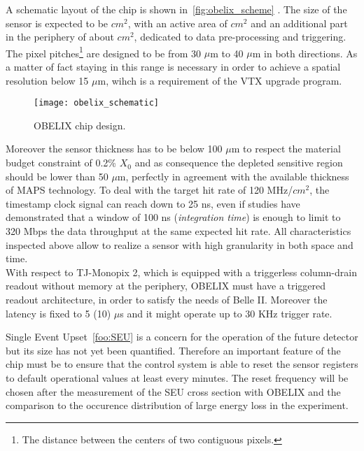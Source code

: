 A schematic layout of the chip is shown in~\autoref{fig:obelix_scheme} . The size of the sensor is expected to be  $cm^{2}$, with an active area of  $cm^{2}$ and an additional part in the periphery of about  $cm^{2}$, dedicated to data pre-processing and triggering. The pixel pitches\footnote{The distance between the centers of two contiguous pixels.} are designed to be from 30 $\mu$m to 40 $\mu$m in both directions. As a matter of fact staying in this range is necessary in order to achieve a spatial resolution below 15 $\mu$m, wihch is a requirement of the VTX upgrade program.

\begin{figure}[h!]
\centering
\texttt{[image: obelix\_schematic]}
\caption{OBELIX chip design.}
\label{fig:obelix_scheme}
\end{figure}

Moreover the sensor thickness has to be below 100 $\mu$m to respect the material budget constraint of 0.2\% $X_{0}$ and as consequence the depleted sensitive region should be lower than 50 $\mu$m, perfectly in agreement with the available thickness of MAPS  technology. 
To deal with the target hit rate of 120 MHz/$cm^{2}$, the timestamp clock signal can reach down to 25 ns, even if studies have demonstrated that a window of 100 ns (\textit{integration time}) is enough to limit to 320 Mbps the data throughput at the same expected hit rate. 
All characteristics inspected above allow to realize a sensor with high granularity in both space and time.\\

With respect to TJ-Monopix 2, which is equipped with a triggerless column-drain readout without memory at the periphery, OBELIX must have a triggered readout architecture, in order to satisfy the needs of Belle II. Moreover the latency is fixed to 5 (10) $\mu$s and it might operate up to 30 KHz trigger rate.

Single Event Upset~\autoref{foo:SEU} is a concern for the operation of the future detector but its size has not yet been quantified. Therefore an important feature of the chip must be to ensure that the control system is able to reset the sensor registers to default operational values at least every minutes. The reset frequency will be chosen after the measurement of the SEU cross section with OBELIX and the comparison to the occurence distribution of large energy loss in the experiment.

